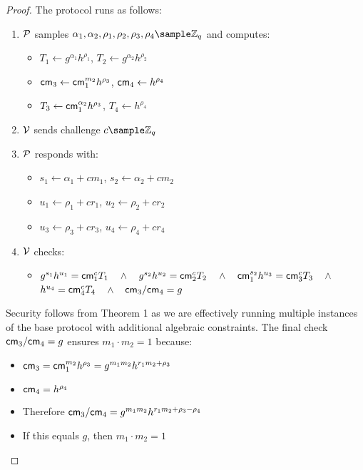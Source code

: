 {\begin{proof}
    The protocol runs as follows:
    \begin{enumerate}
        \item $\mathcal{P}$ samples $\alpha_1, \alpha_2, \rho_1, \rho_2, \rho_3, \rho_4 \sample \Z_q$ and computes:
            \begin{itemize}
                \item $T_1 \gets g^{\alpha_1}h^{\rho_1}$, $T_2 \gets g^{\alpha_2}h^{\rho_2}$
                \item $\mathsf{cm}_3 \gets \mathsf{cm}_1^{m_2}h^{\rho_3}$, $\mathsf{cm}_4 \gets h^{\rho_4}$
                \item $T_3 \gets \mathsf{cm}_1^{\alpha_2}h^{\rho_3}$, $T_4 \gets h^{\rho_4}$
            \end{itemize}
        
        \item $\mathcal{V}$ sends challenge $c \sample \Z_q$
        
        \item $\mathcal{P}$ responds with:
            \begin{itemize}
                \item $s_1 \gets \alpha_1 + cm_1$, $s_2 \gets \alpha_2 + cm_2$
                \item $u_1 \gets \rho_1 + cr_1$, $u_2 \gets \rho_2 + cr_2$
                \item $u_3 \gets \rho_3 + cr_3$, $u_4 \gets \rho_4 + cr_4$
            \end{itemize}
            
        \item $\mathcal{V}$ checks:
         \begin{itemize}
            \item $g^{s_1}h^{u_1} = \mathsf{cm}_1^cT_1$ $\;\; \wedge \;\;$ $g^{s_2}h^{u_2} = \mathsf{cm}_2^cT_2$ $\; \; \wedge \;\;$ $\mathsf{cm}_1^{s_2}h^{u_3} = \mathsf{cm}_3^cT_3$ $\;\; \wedge \;\;$ $h^{u_4} = \mathsf{cm}_4^cT_4$ $\;\; \wedge \;\;$ $\mathsf{cm}_3 / \mathsf{cm}_4 = g$
         \end{itemize}
    \end{enumerate}

    \noindent Security follows from Theorem 1 as we are effectively running multiple instances of the base protocol with additional algebraic constraints. The final check $\mathsf{cm}_3/\mathsf{cm}_4 = g$ ensures $m_1 \cdot m_2 = 1$ because:
    \begin{itemize}
        \item $\mathsf{cm}_3 = \mathsf{cm}_1^{m_2}h^{\rho_3} = g^{m_1m_2}h^{r_1m_2 + \rho_3}$
        \item $\mathsf{cm}_4 = h^{\rho_4}$
        \item Therefore $\mathsf{cm}_3/\mathsf{cm}_4 = g^{m_1m_2}h^{r_1m_2 + \rho_3 - \rho_4}$
        \item If this equals $g$, then $m_1 \cdot m_2 = 1$
    \end{itemize}
\end{proof}


}
